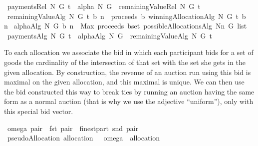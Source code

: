 \begin{isabellebody}
\isanewline
{}\isamarkupfalse%
\ {\isachardoublequoteopen}paymentsRel\ N\ G\ t\ {\isacharequal}{\isacharequal}\ alpha\ N\ G\ {\isacharminus}\ remainingValueRel\ N\ G\ t{\isachardoublequoteclose}\isanewline
\isanewline
{}\isamarkupfalse%
\ {\isachardoublequoteopen}remainingValueAlg\ N\ G\ t\ b\ n\ {\isacharequal}{\isacharequal}\ proceeds\ b\ {\isacharparenleft}winningAllocationAlg\ N\ G\ t\ b\ {\isacharminus}{\isacharminus}\ n{\isacharparenright}{\isachardoublequoteclose}\isanewline
\isanewline
{}\isamarkupfalse%
\ {\isachardoublequoteopen}alphaAlg\ N\ G\ b\ n\ {\isacharequal}{\isacharequal}\ Max\ {\isacharparenleft}{\isacharparenleft}proceeds\ b{\isacharparenright}{\isacharbackquote}{\isacharparenleft}set\ {\isacharparenleft}possibleAllocationsAlg{}\ {\isacharparenleft}N{\isacharminus}{\isacharbraceleft}n{\isacharbraceright}{\isacharparenright}\ {\isacharparenleft}G{\isacharcolon}{\isacharcolon}{\isacharunderscore}\ list{\isacharparenright}{\isacharparenright}{\isacharparenright}{\isacharparenright}{\isachardoublequoteclose}\isanewline
{}\isamarkupfalse%
\ {\isachardoublequoteopen}paymentsAlg\ N\ G\ t\ {\isacharequal}{\isacharequal}\ alphaAlg\ N\ G\ {\isacharminus}\ remainingValueAlg\ N\ G\ t{\isachardoublequoteclose}%
\isamarkuptrue%
%
\begin{isamarkuptext}%
To each allocation we associate the bid in which each participant bids for a set of goods 
the cardinality of the intersection of that set with the set she gets in the given allocation.
By construction, the revenue of an auction run using this bid is maximal on the given allocation,
and this maximal is unique.
We can then use the bid constructed this way  to break ties by running an auction 
having the same form as a normal auction (that is why we use the adjective ``uniform''), 
only with this special bid vector.%
\end{isamarkuptext}%
\isamarkuptrue%
\isamarkupfalse%
\ {\isachardoublequoteopen}omega\ pair\ {\isacharequal}{\isacharequal}\ {\isacharbraceleft}fst\ pair{\isacharbraceright}\ {\isasymtimes}\ {\isacharparenleft}finestpart\ {\isacharparenleft}snd\ pair{\isacharparenright}{\isacharparenright}{\isachardoublequoteclose}\isanewline
{}\isamarkupfalse%
\ {\isachardoublequoteopen}pseudoAllocation\ allocation\ {\isacharequal}{\isacharequal}\ {\isasymUnion}\ {\isacharparenleft}omega\ {\isacharbackquote}\ allocation{\isacharparenright}{\isachardoublequoteclose}\isanewline

\end{isabellebody}
